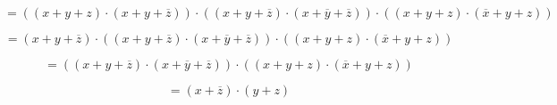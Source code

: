 \[{} = {{\left( {\left( {{x + y} + z} \right) \cdot \left( {{x + y} + \overline{z}} \right)} \right) \cdot \left( {\left( {{x + y} + \overline{z}} \right) \cdot \left( {{x + \overline{y}} + \overline{z}} \right)} \right)} \cdot \left( {\left( {{x + y} + z} \right) \cdot \left( {{\overline{x} + y} + z} \right)} \right)}\]

\[{} = {{\left( {{x + y} + \overline{z}} \right) \cdot \left( {\left( {{x + y} + \overline{z}} \right) \cdot \left( {{x + \overline{y}} + \overline{z}} \right)} \right)} \cdot \left( {\left( {{x + y} + z} \right) \cdot \left( {{\overline{x} + y} + z} \right)} \right)}\]

\[{} = {\left( {\left( {{x + y} + \overline{z}} \right) \cdot \left( {{x + \overline{y}} + \overline{z}} \right)} \right) \cdot \left( {\left( {{x + y} + z} \right) \cdot \left( {{\overline{x} + y} + z} \right)} \right)}\]

\[{} = {\left( {x + \overline{z}} \right) \cdot \left( {y + z} \right)}\]
